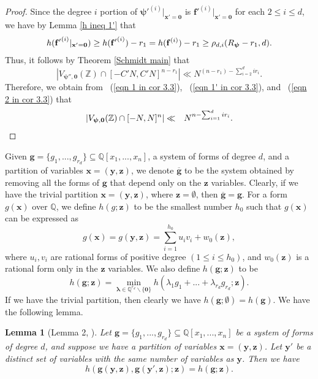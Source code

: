 \documentclass[12pt]{amsart}
\newtheorem{lem}[thm]{Lemma}
\theoremstyle{definition}
\theoremstyle{remark}
\numberwithin{equation}{section}
\begin{document}
\begin{proof}
Since the degree $i$ portion of $\boldsymbol{\psi'}^{(i)} |_{\mathbf{x}' = \mathbf{0}}$ is $\mathbf{f'}^{(i)} |_{{\mathbf{x}' = \mathbf{0}}}$ for each $2 \leq i \leq d$, we have by Lemma \ref{h ineq 1'} that
\begin{eqnarray}
\notag
h( \mathbf{f'}^{(i)} |_{{\mathbf{x}' = \mathbf{0}}} ) \geq   h( \mathbf{f'}^{(i)} ) - r_1 = h( \mathbf{f}^{(i)} ) - r_1 \geq \rho_{d,i}(R_{\boldsymbol{\psi}} - r_1, d).
\end{eqnarray}
Thus, it follows by Theorem \ref{Schmidt main} that
\begin{equation}
\label{eqn 2 in cor 3.3}
|V_{\boldsymbol{\psi}'', \mathbf{0} } (\mathbb{Z}) \cap [-C' N, C' N]^{n-r_1}  |
\ll N^{(n-r_1) - \sum_{i=2}^d i r_i }.
\end{equation}
Therefore, we obtain from ~(\ref{eqn 1 in cor 3.3}),  ~(\ref{eqn 1' in cor 3.3}), and ~(\ref{eqn 2 in cor 3.3}) that
\begin{eqnarray}
| V_{\boldsymbol{\psi}, \mathbf{0} }(\mathbb{Z}) \cap [-N, N]^n  | 
&\ll&
N^{ n - \sum_{i=1}^d i r_i }.
\notag
\end{eqnarray}

\end{proof}

Given $\mathbf{g} = \{g_1, ..., g_{r_d}  \} \subseteq \mathbb{Q}[x_1, ..., x_n]$, a system of forms of degree $d$, and a partition of variables $\mathbf{x} = (\mathbf{y}, \mathbf{z})$, we denote $\overline{\mathbf{g}}$ to be the system obtained by removing all the forms of $\mathbf{g}$ that depend only on the $\mathbf{z}$ variables. Clearly, if we have the trivial partition $\mathbf{x} = (\mathbf{y}, \mathbf{z})$, where $\mathbf{z} = \emptyset$, then $\overline{\mathbf{g}} = \mathbf{g}$.
For a form $g(\mathbf{x})$ over $\mathbb{Q}$, we define $h(g;\mathbf{z})$ to be the smallest number $h_0$ such that $g(\mathbf{x})$
can be expressed as
$$
g(\mathbf{x}) =  g(\mathbf{y}, \mathbf{z}) = \sum_{i=1}^{h_0} u_i v_i + w_0(\mathbf{z}),
$$
where $u_i, v_i$ are rational forms of positive degree $(1 \leq i \leq h_0)$, and
$w_0(\mathbf{z})$ is a rational form only in the $\mathbf{z}$ variables.
We also define $h(\mathbf{g}; \mathbf{z})$ to be
$$
h(\mathbf{g}; \mathbf{z}) = \min_{\boldsymbol{\lambda} \in \mathbb{Q}^{r_d} \backslash \{ \boldsymbol{0} \}}  h( \lambda_{1} g_1 + ... + \lambda_{r_d} g_{r_d}; \mathbf{z} ).
$$
If we have the trivial partition, then clearly we have $h(\mathbf{g}; \emptyset) = h(\mathbf{g}).$
We have the following lemma.
\begin{lem}[Lemma 2, \cite{CM}]
\label{Lemma 2 in CM}
Let $\mathbf{g} = \{g_1, ..., g_{r_d}  \} \subseteq \mathbb{Q}[x_1, ..., x_n]$ be a system of forms of degree $d$, and suppose we have a partition of variables $\mathbf{x} = (\mathbf{y}, \mathbf{z})$. Let $\mathbf{y}'$ be a distinct set of variables with the same number of variables as $\mathbf{y}$.
Then we have
$$
h(\mathbf{g}(\mathbf{y}, \mathbf{z}),  \mathbf{g}(\mathbf{y}', \mathbf{z}) ; \mathbf{z} ) = h( \mathbf{g} ; \mathbf{z} ).
$$
\end{lem}
\end{document}
